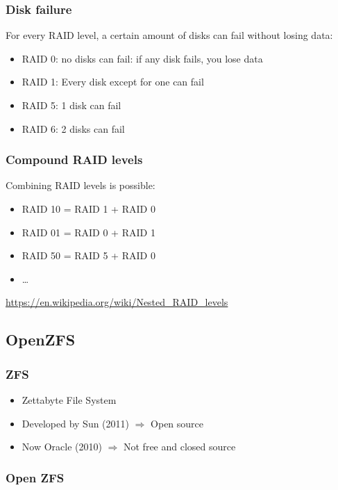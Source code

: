 \documentclass{article}
\begin{document}
\subsubsection{Disk failure}

For every RAID level, a certain amount of disks can fail without losing data:

\begin{itemize}
    \item RAID 0: no disks can fail: if any disk fails, you lose data
    \item RAID 1: Every disk except for one can fail
    \item RAID 5: 1 disk can fail
    \item RAID 6: 2 disks can fail
\end{itemize}

\subsubsection{Compound RAID levels}

Combining RAID levels is possible:

\begin{itemize}
    \item RAID 10 = RAID 1 + RAID 0
    \item RAID 01 = RAID 0 + RAID 1
    \item RAID 50 = RAID 5 + RAID 0
    \item \dots
\end{itemize}

\url{https://en.wikipedia.org/wiki/Nested_RAID_levels}

\subsection{OpenZFS}

\subsubsection{ZFS}

\begin{itemize}
    \item Zettabyte File System
    \item Developed by Sun (2011) $\Rightarrow$ Open source
    \item Now Oracle (2010) $\Rightarrow$ Not free and closed source
\end{itemize}

\subsubsection{Open ZFS}
\end{document}
